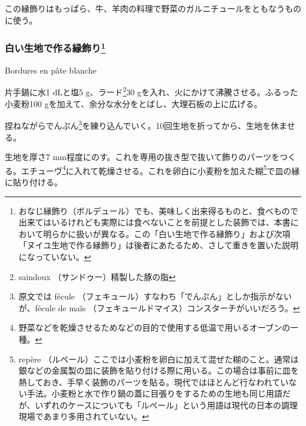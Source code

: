 \begin{recette}
この縁飾りはもっぱら、牛、羊肉の料理で野菜のガルニチュールをともなうものに使う。

\atoaki{}

\hypertarget{bordures-en-pate-blanche}{%
\subsubsection[白い生地で作る縁飾り]{\texorpdfstring{白い生地で作る縁飾り\footnote{おなじ縁飾り（ボルデュール）でも、美味しく出来得るものと、食べもので出来てはいるけれども実際には食べないことを前提とした装飾では、本書において明らかに扱いが異なる。この「白い生地で作る縁飾り」および次項「ヌイユ生地で作る縁飾り」は後者にあたるため、さして重きを置いた説明になっていない。}}{白い生地で作る縁飾り}}\label{bordures-en-pate-blanche}}

\begin{frsubenv}

Bordures en pâte blanche

\end{frsubenv}


片手鍋に水1 dLと塩5 g、ラード\footnote{saindoux
  （サンドゥー）精製した豚の脂}30
gを入れ、火にかけて沸騰させる。ふるった小麦粉100
gを加えて、余分な水分をとばし、大理石板の上に広げる。

捏ねながらでんぷん\footnote{原文では fécule
  （フェキュール）すなわち「でんぷん」としか指示がないが、fécule de maïs
  （フェキュールドマイス）コンスターチがいいだろう。}を練り込んでいく。10回生地を折ってから、生地を休ませる。

生地を厚さ7
mm程度にのす。これを専用の抜き型で抜いて飾りのパーツをつくる。エチューヴ\footnote{野菜などを乾燥させるためなどの目的で使用する低温で用いるオーブンの一種。}に入れて乾燥させる。これを卵白に小麦粉を加えた糊\footnote{repère
  （ルペール）ここでは小麦粉を卵白に加えて混ぜた糊のこと。通常は銀などの金属製の皿に装飾を貼り付ける際に用いる。この場合は事前に皿を熱しておき、手早く装飾のパーツを貼る。現代ではほとんど行なわれていない手法。小麦粉と水で作り鍋の蓋に目張りをするための生地も同じ用語だが、いずれのケースについても「ルペール」という用語は現代の日本の調理現場であまり多用されていない。}で皿の縁に貼り付ける。


\end{recette}
